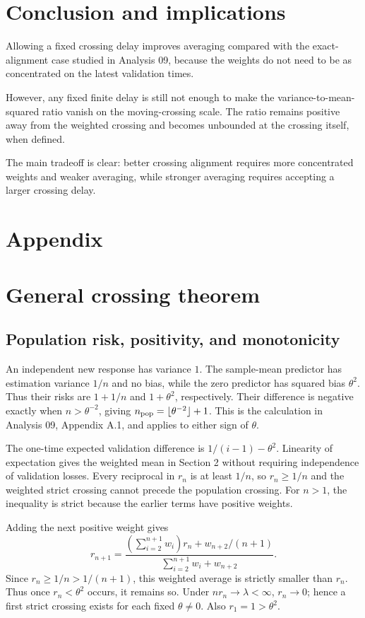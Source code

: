 \documentclass[11pt]{article}
\theoremstyle{definition}
\begin{document}
\section{Conclusion and implications}

Allowing a fixed crossing delay improves averaging compared with the
exact-alignment case studied in Analysis 09, because the weights do not
need to be as concentrated on the latest validation times.

However, any fixed finite delay is still not enough to make the
variance-to-mean-squared ratio vanish on the moving-crossing scale.
The ratio remains positive away from the weighted crossing and becomes
unbounded at the crossing itself, when defined.

The main tradeoff is clear: better crossing alignment requires more
concentrated weights and weaker averaging, while stronger averaging
requires accepting a larger crossing delay.

\appendix
\section*{Appendix}
\section{General crossing theorem}

\subsection{Population risk, positivity, and monotonicity}\label{app:monotonicity}
An independent new response has variance $1$. The sample-mean
predictor has estimation variance $1/n$ and no bias, while the zero
predictor has squared bias $\theta^2$. Thus their risks are $1+1/n$
and $1+\theta^2$, respectively. Their difference is negative exactly
when $n>\theta^{-2}$, giving
$n_{\rm pop}=\lfloor\theta^{-2}\rfloor+1$. This is the calculation
in Analysis 09, Appendix A.1, and applies to either sign of $\theta$.

The one-time expected validation difference is
$1/(i-1)-\theta^2$. Linearity of expectation gives the weighted mean
in Section 2 without requiring independence of validation losses.
Every reciprocal in $r_n$ is at least $1/n$, so $r_n\ge1/n$ and
the weighted strict crossing cannot precede the population crossing.
For $n>1$, the inequality is strict because the earlier terms have
positive weights.

Adding the next positive weight gives
\[
r_{n+1}=
\frac{(\sum_{i=2}^{n+1}w_i)r_n+w_{n+2}/(n+1)}
{\sum_{i=2}^{n+1}w_i+w_{n+2}}.
\]
Since $r_n\ge1/n>1/(n+1)$, this weighted average is strictly smaller
than $r_n$. Thus once $r_n<\theta^2$ occurs, it remains so.
Under $nr_n\to\lambda<\infty$, $r_n\to0$; hence a first strict
crossing exists for each fixed $\theta\ne0$. Also $r_1=1>\theta^2$.
\end{document}
